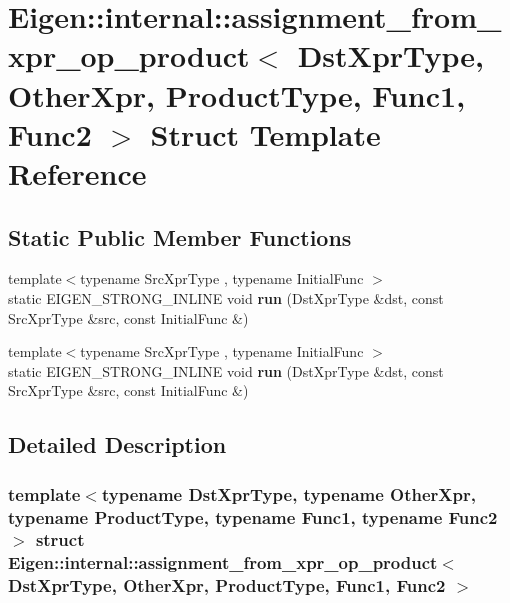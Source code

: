 \hypertarget{struct_eigen_1_1internal_1_1assignment__from__xpr__op__product}{}\section{Eigen\+:\+:internal\+:\+:assignment\+\_\+from\+\_\+xpr\+\_\+op\+\_\+product$<$ Dst\+Xpr\+Type, Other\+Xpr, Product\+Type, Func1, Func2 $>$ Struct Template Reference}
\label{struct_eigen_1_1internal_1_1assignment__from__xpr__op__product}
\subsection*{Static Public Member Functions}
\begin{DoxyCompactItemize}
\item 
\mbox{\label{struct_eigen_1_1internal_1_1assignment__from__xpr__op__product_a7409e659f7fd561b060a4a262ba3672a}} 
{\footnotesize template$<$typename Src\+Xpr\+Type , typename Initial\+Func $>$ }\\static E\+I\+G\+E\+N\+\_\+\+S\+T\+R\+O\+N\+G\+\_\+\+I\+N\+L\+I\+NE void {\bfseries run} (Dst\+Xpr\+Type \&dst, const Src\+Xpr\+Type \&src, const Initial\+Func \&)
\item 
\mbox{\label{struct_eigen_1_1internal_1_1assignment__from__xpr__op__product_a7409e659f7fd561b060a4a262ba3672a}} 
{\footnotesize template$<$typename Src\+Xpr\+Type , typename Initial\+Func $>$ }\\static E\+I\+G\+E\+N\+\_\+\+S\+T\+R\+O\+N\+G\+\_\+\+I\+N\+L\+I\+NE void {\bfseries run} (Dst\+Xpr\+Type \&dst, const Src\+Xpr\+Type \&src, const Initial\+Func \&)
\end{DoxyCompactItemize}


\subsection{Detailed Description}
\subsubsection*{template$<$typename Dst\+Xpr\+Type, typename Other\+Xpr, typename Product\+Type, typename Func1, typename Func2$>$\newline
struct Eigen\+::internal\+::assignment\+\_\+from\+\_\+xpr\+\_\+op\+\_\+product$<$ Dst\+Xpr\+Type, Other\+Xpr, Product\+Type, Func1, Func2 $>$}



